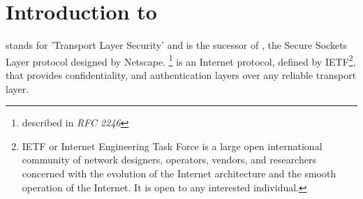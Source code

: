 \chapter{Introduction to \tls{}}

\label{sec:tlsintro}
\tls{} stands for 'Transport Layer Security' and is the sucessor of \ssl{}, 
the Secure Sockets Layer protocol designed by Netscape. 
\tlsI{}\footnote{described in {\it RFC 2246}} is an Internet protocol,
defined by {IETF}\footnote{IETF or Internet Engineering Task Force 
is a large open international community of network
designers, operators, vendors, and researchers concerned with the evolution of 
the Internet architecture and the smooth operation of the Internet. It is open 
to any interested individual.}, 
that provides confidentiality, and authentication layers over any reliable
transport layer.












